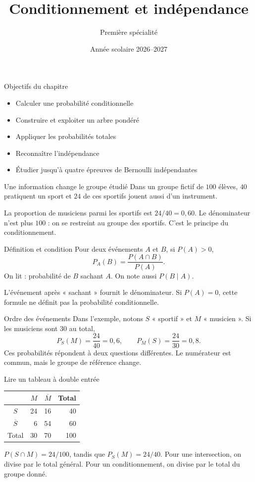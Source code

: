 \documentclass[aspectratio=169,12pt]{beamer}
\title{Conditionnement et indépendance}
\subtitle{Première spécialité}
\date{Année scolaire 2026--2027}
\begin{document}
\begin{frame}\titlepage\end{frame}
\begin{frame}{Objectifs du chapitre}\begin{itemize}
\item Calculer une probabilité conditionnelle
\item Construire et exploiter un arbre pondéré
\item Appliquer les probabilités totales
\item Reconnaître l’indépendance
\item Étudier jusqu’à quatre épreuves de Bernoulli indépendantes
\end{itemize}\end{frame}
\renewcommand{\slidekind}{COMPRENDRE}
\begin{frame}[t,fragile]{Une information change le groupe étudié}
Dans un groupe fictif de $100$ élèves, $40$ pratiquent un sport et $24$ de ces sportifs jouent aussi d’un instrument.\medskip\par La proportion de musiciens parmi les sportifs est $24/40=0,60$. Le dénominateur n’est plus $100$ : on se restreint au groupe des sportifs. C’est le principe du conditionnement.
\end{frame}
\renewcommand{\slidekind}{COMPRENDRE}
\begin{frame}[t,fragile]{Définition et condition}
Pour deux événements $A$ et $B$, si $P(A)>0$,\[\boxed{P_A(B)=\frac{P(A\cap B)}{P(A)}}.\]On lit : probabilité de $B$ sachant $A$. On note aussi $P(B\mid A)$.\medskip\par L’événement après « sachant » fournit le dénominateur. Si $P(A)=0$, cette formule ne définit pas la probabilité conditionnelle.
\end{frame}
\renewcommand{\slidekind}{COMPRENDRE}
\begin{frame}[t,fragile]{Ordre des événements}
Dans l’exemple, notons $S$ « sportif » et $M$ « musicien ». Si les musiciens sont $30$ au total,\[P_S(M)=\frac{24}{40}=0,6,\qquad P_M(S)=\frac{24}{30}=0,8.\]Ces probabilités répondent à deux questions différentes. Le numérateur est commun, mais le groupe de référence change.
\end{frame}
\renewcommand{\slidekind}{COMPRENDRE}
\begin{frame}[t,fragile]{Lire un tableau à double entrée}
\begin{center}\begin{tabular}{c|rr|r}&$M$&$\overline M$&Total\\\hline$S$&24&16&40\\$\overline S$&6&54&60\\\hline Total&30&70&100\end{tabular}\end{center}\medskip $P(S\cap M)=24/100$, tandis que $P_S(M)=24/40$. Pour une intersection, on divise par le total général. Pour un conditionnement, on divise par le total du groupe donné.
\end{frame}
\end{document}
